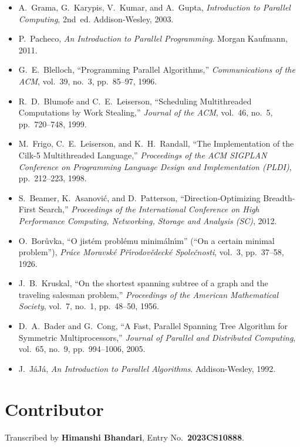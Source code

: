 \begin{itemize}
  \item A.~Grama, G.~Karypis, V.~Kumar, and A.~Gupta,
        \emph{Introduction to Parallel Computing}, 2nd~ed.
        Addison-Wesley, 2003.~\cite{grama2003}
  \item P.~Pacheco, \emph{An Introduction to Parallel Programming}.
        Morgan Kaufmann, 2011.~\cite{pacheco2011}
  \item G.~E.~Blelloch, ``Programming Parallel Algorithms,''
        \emph{Communications of the ACM}, vol.~39, no.~3,
        pp.~85--97, 1996.~\cite{blelloch1996}
  \item R.~D.~Blumofe and C.~E.~Leiserson, ``Scheduling Multithreaded
        Computations by Work Stealing,'' \emph{Journal of the ACM},
        vol.~46, no.~5, pp.~720--748, 1999.~\cite{blumofe1999}
  \item M.~Frigo, C.~E.~Leiserson, and K.~H.~Randall, ``The
        Implementation of the Cilk-5 Multithreaded Language,''
        \emph{Proceedings of the ACM SIGPLAN Conference on
        Programming Language Design and Implementation (PLDI)},
        pp.~212--223, 1998.~\cite{frigo1998cilk}
  \item S.~Beamer, K.~Asanovi\'c, and D.~Patterson,
        ``Direction-Optimizing Breadth-First Search,''
        \emph{Proceedings of the International Conference on High
        Performance Computing, Networking, Storage and Analysis (SC)},
        2012.~\cite{beamer2012}
  \item O.~Bor\r{u}vka, ``O jist\'em probl\'emu minim\'aln\'\i m''
        (``On a certain minimal problem''), \emph{Pr\'ace Moravsk\'e
        P\v{r}\'\i rodov\v{e}deck\'e Spole\v{c}nosti}, vol.~3,
        pp.~37--58, 1926.~\cite{boruvka1926}
  \item J.~B.~Kruskal, ``On the shortest spanning subtree of a graph
        and the traveling salesman problem,'' \emph{Proceedings of the
        American Mathematical Society}, vol.~7, no.~1, pp.~48--50,
        1956.~\cite{kruskal1956}
  \item D.~A.~Bader and G.~Cong, ``A Fast, Parallel Spanning Tree
        Algorithm for Symmetric Multiprocessors,'' \emph{Journal of
        Parallel and Distributed Computing}, vol.~65, no.~9,
        pp.~994--1006, 2005.~\cite{bader2005}
  \item J.~J\'aJ\'a, \emph{An Introduction to Parallel Algorithms}.
        Addison-Wesley, 1992.~\cite{jaja1992}
\end{itemize}
\section*{Contributor}

\begin{ppnote}
Transcribed by \textbf{Himanshi Bhandari}, Entry No.\ \textbf{2023CS10888}.
\end{ppnote}